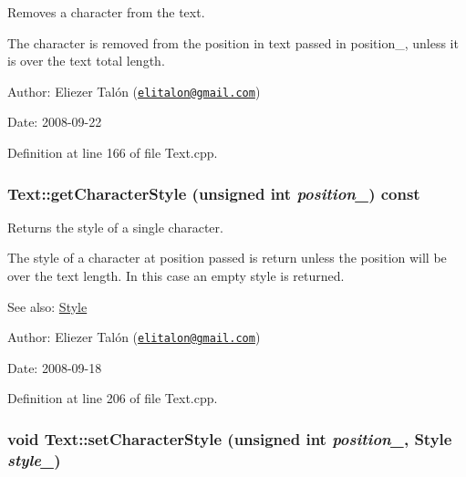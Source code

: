 Removes a character from the text. 

The character is removed from the position in text passed in position\_\-, unless it is over the text total length.

\begin{Desc}
\item[Author:]Eliezer Talón (\href{mailto:elitalon@gmail.com}{\tt elitalon@gmail.com}) \end{Desc}
\begin{Desc}
\item[Date:]2008-09-22 \end{Desc}


Definition at line 166 of file Text.cpp.\hypertarget{class_text_e7f5d4bb80673566a91e53f70fdfcaa2}{
\subsubsection[getCharacterStyle]{ Text::getCharacterStyle (unsigned int {\em position\_\-}) const}}
\label{class_text_e7f5d4bb80673566a91e53f70fdfcaa2}


Returns the style of a single character. 

The style of a character at position passed is return unless the position will be over the text length. In this case an empty style is returned.

\begin{Desc}
\item[See also:]\hyperlink{class_style}{Style}\end{Desc}
\begin{Desc}
\item[Author:]Eliezer Talón (\href{mailto:elitalon@gmail.com}{\tt elitalon@gmail.com}) \end{Desc}
\begin{Desc}
\item[Date:]2008-09-18 \end{Desc}


Definition at line 206 of file Text.cpp.\hypertarget{class_text_675870393c37aea8ea2018bc318620f3}{
\subsubsection[setCharacterStyle]{\setlength{\rightskip}{0pt plus 5cm}void Text::setCharacterStyle (unsigned int {\em position\_\-}, \/  {\bf Style} {\em style\_\-})}}
\label{class_text_675870393c37aea8ea2018bc318620f3}


